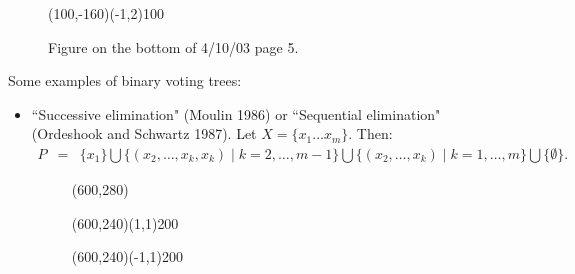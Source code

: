 \documentclass[12pt]{article}
\newcommand{\n}{\noindent}
\newcommand{\s}{\vspace{5mm}}
\begin{document}
\begin{figure}[htb]
\begin{egame}
\putbranch(100,-160)(-1,2){100}

%
\end{egame}
\hspace*{\fill}\s\s\s\s\s\s\s\s\s
\caption[]{Figure on the bottom of 4/10/03 page 5.}\label{f:eleven}
\end{figure}

\s
\n  Some examples of binary voting trees:
\begin{itemize}
\item ``Successive elimination" (Moulin 1986) or ``Sequential elimination" (Ordeshook and Schwartz 1987).  Let $X=\{x_1\hdots x_m\}$.  Then: 
\begin{eqnarray*}
P&=&\{x_1\}\bigcup\{(x_2,\hdots,x_k,x_k)\mid k=2,\hdots,m-1\}\bigcup\{(x_2,\hdots,x_k)\mid k=1,\hdots,m\}\bigcup\{\emptyset\}.
\end{eqnarray*}

\begin{figure}[htb]
\hspace*{\fill}
\begin{egame}(600,280)

\renewcommand{\egarrowstyle}{}

%
\putbranch(600,240)(1,1){200}

\renewcommand{\egarrowstyle}{}

\putbranch(600,240)(-1,1){200}

\renewcommand{\egarrowstyle}{}


\end{egame}
\end{figure}
\end{itemize}
\end{document}

